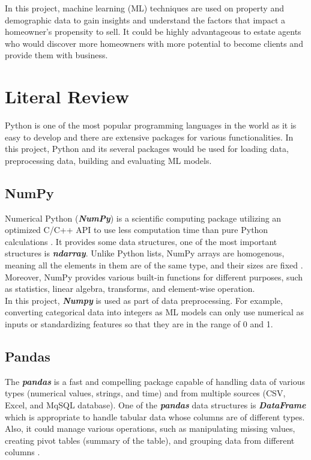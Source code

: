 \documentclass[12pt,twoside]{report}
\begin{document}
In this project, machine learning (ML) techniques are used on property and demographic data to gain insights and understand the factors that impact a homeowner's propensity to sell. It could be highly advantageous to estate agents who would discover more homeowners with more potential to become clients and provide them with business. 

\chapter{Literal Review}
Python is one of the most popular programming languages in the world as it is easy to develop and there are extensive packages for various functionalities. In this project, Python and its several packages would be used for loading data, preprocessing data, building and evaluating ML models. 

\section{NumPy}
Numerical Python (\textit{\textbf{NumPy}}) is a scientific computing package utilizing an optimized C/C++ API to use less computation time than pure Python calculations \citep{RN6}. It provides some data structures, one of the most important structures is \textbf{\emph{ndarray}}. Unlike Python lists, NumPy arrays are homogenous, meaning all the elements in them are of the same type, and their sizes are fixed \citep{RN4}.  Moreover, NumPy provides various built-in functions for different purposes, such as statistics, linear algebra,  transforms, and element-wise operation. 
\\

In this project, \textit{\textbf{Numpy}} is used as part of data preprocessing. For example, converting categorical data into integers as ML models can only use numerical as inputs or standardizing features so that they are in the range of 0 and 1. 

\section{Pandas}
The \textbf{\textit{pandas}} is a fast and compelling package capable of handling data of various types (numerical values, strings, and time) and from multiple sources (CSV, Excel, and MqSQL database). One of the \textbf{\textit{pandas}} data structures is \textbf{\textit{DataFrame}} which is appropriate to handle tabular data whose columns are of different types. Also, it could manage various operations, such as manipulating missing values, creating pivot tables (summary of the table), and grouping data from different columns \citep{RN4}. 
\\
\end{document}
